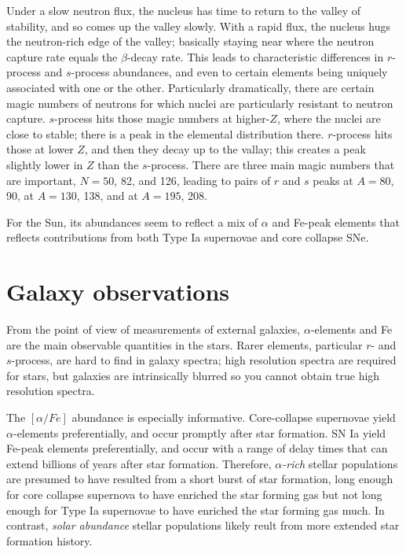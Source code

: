 Under a slow neutron flux, the nucleus has time to return to the
valley of stability, and so comes up the valley slowly. With a rapid
flux, the nucleus hugs the neutron-rich edge of the valley; basically
staying near where the neutron capture rate equals the $\beta$-decay
rate. This leads to characteristic differences in $r$-process and
$s$-process abundances, and even to certain elements being uniquely
associated with one or the other. Particularly dramatically, there are
certain magic numbers of neutrons for which nuclei are particularly
resistant to neutron capture. $s$-process hits those magic numbers at
higher-$Z$, where the nuclei are close to stable; there is a peak in
the elemental distribution there. $r$-process hits those at lower $Z$,
and then they decay up to the vallay; this creates a peak slightly
lower in $Z$ than the $s$-process. There are three main magic numbers
that are important, $N=50$, 82, and 126, leading to pairs of $r$ and
$s$ peaks at $A=80$, 90, at $A=130$, 138, and at $A=195$, 208.

For the Sun, its abundances seem to reflect a mix of $\alpha$ and
Fe-peak elements that reflects contributions from both Type Ia
supernovae and core collapse SNe.

\section{Galaxy observations}

From the point of view of measurements of external galaxies,
$\alpha$-elements and Fe are the main observable quantities in the
stars. Rarer elements, particular $r$- and $s$-process, are hard to
find in galaxy spectra; high resolution spectra are required for
stars, but galaxies are intrinsically blurred so you cannot obtain
true high resolution spectra.

The $[\alpha/Fe]$ abundance is especially informative. Core-collapse
supernovae yield $\alpha$-elements preferentially, and occur promptly
after star formation. SN Ia yield Fe-peak elements preferentially, and
occur with a range of delay times that can extend billions of years
after star formation. Therefore, {\it $\alpha$-rich} stellar
populations are presumed to have resulted from a short burst of star
formation, long enough for core collapse supernova to have enriched
the star forming gas but not long enough for Type Ia supernovae to
have enriched the star forming gas much. In contrast, {\it solar
  abundance} stellar populations likely reult from more extended star
formation history.

